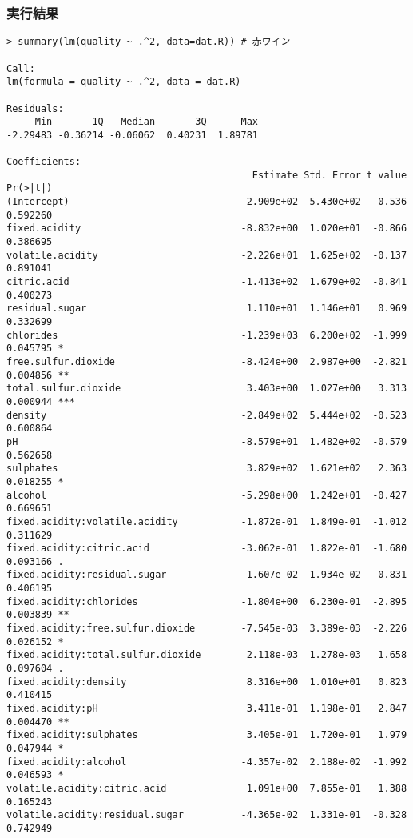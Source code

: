 \documentclass{jsarticle}
\begin{document}
\subsubsection*{実行結果}
\begin{verbatim}
> summary(lm(quality ~ .^2, data=dat.R)) # 赤ワイン

Call:
lm(formula = quality ~ .^2, data = dat.R)

Residuals:
     Min       1Q   Median       3Q      Max 
-2.29483 -0.36214 -0.06062  0.40231  1.89781 

Coefficients:
                                           Estimate Std. Error t value Pr(>|t|)    
(Intercept)                               2.909e+02  5.430e+02   0.536 0.592260    
fixed.acidity                            -8.832e+00  1.020e+01  -0.866 0.386695    
volatile.acidity                         -2.226e+01  1.625e+02  -0.137 0.891041    
citric.acid                              -1.413e+02  1.679e+02  -0.841 0.400273    
residual.sugar                            1.110e+01  1.146e+01   0.969 0.332699    
chlorides                                -1.239e+03  6.200e+02  -1.999 0.045795 *  
free.sulfur.dioxide                      -8.424e+00  2.987e+00  -2.821 0.004856 ** 
total.sulfur.dioxide                      3.403e+00  1.027e+00   3.313 0.000944 ***
density                                  -2.849e+02  5.444e+02  -0.523 0.600864    
pH                                       -8.579e+01  1.482e+02  -0.579 0.562658    
sulphates                                 3.829e+02  1.621e+02   2.363 0.018255 *  
alcohol                                  -5.298e+00  1.242e+01  -0.427 0.669651    
fixed.acidity:volatile.acidity           -1.872e-01  1.849e-01  -1.012 0.311629    
fixed.acidity:citric.acid                -3.062e-01  1.822e-01  -1.680 0.093166 .  
fixed.acidity:residual.sugar              1.607e-02  1.934e-02   0.831 0.406195    
fixed.acidity:chlorides                  -1.804e+00  6.230e-01  -2.895 0.003839 ** 
fixed.acidity:free.sulfur.dioxide        -7.545e-03  3.389e-03  -2.226 0.026152 *  
fixed.acidity:total.sulfur.dioxide        2.118e-03  1.278e-03   1.658 0.097604 .  
fixed.acidity:density                     8.316e+00  1.010e+01   0.823 0.410415    
fixed.acidity:pH                          3.411e-01  1.198e-01   2.847 0.004470 ** 
fixed.acidity:sulphates                   3.405e-01  1.720e-01   1.979 0.047944 *  
fixed.acidity:alcohol                    -4.357e-02  2.188e-02  -1.992 0.046593 *  
volatile.acidity:citric.acid              1.091e+00  7.855e-01   1.388 0.165243    
volatile.acidity:residual.sugar          -4.365e-02  1.331e-01  -0.328 0.742949    

\end{verbatim}
\end{document}
